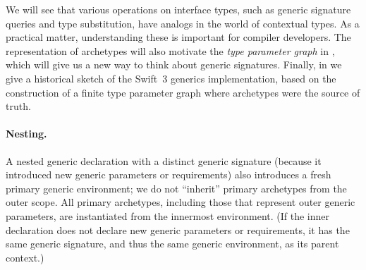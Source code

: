 \documentclass[../generics]{subfiles}
\begin{document}
We will see that various operations on interface types, such as generic signature queries and type substitution, have analogs in the world of contextual types. As a practical matter, understanding these is important for compiler developers. The representation of archetypes will also motivate the \emph{type parameter graph} in , which will give us a new way to think about generic signatures. Finally, in  we give a historical sketch of the Swift~3 generics implementation, based on the construction of a finite type parameter graph where archetypes were the source of truth.

\paragraph{Nesting.}
A nested generic declaration with a distinct generic signature (because it introduced new generic parameters or requirements) also introduces a fresh primary generic environment; we do not ``inherit'' primary archetypes from the outer scope. All primary archetypes, including those that represent outer generic parameters, are instantiated from the innermost environment. (If the inner declaration does not declare new generic parameters or requirements, it has the same generic signature, and thus the same generic environment, as its parent context.)
\end{document}
